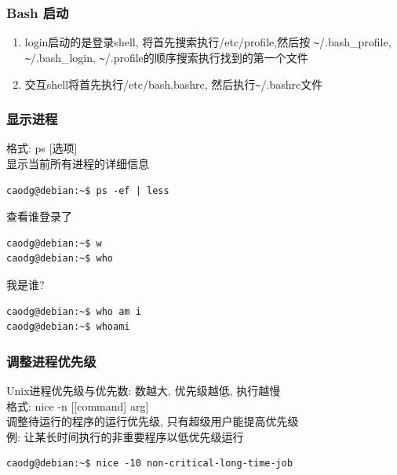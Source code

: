 \documentclass[compress]{beamer}
\begin{document}
\begin{frame}[containsverbatim]
\frametitle{Bash 启动}

\begin{enumerate}
\item login启动的是登录shell,
将首先搜索执行/etc/profile,然后按 \verb=~=/.bash\_profile,
\verb=~=/.bash\_login,
\verb=~=/.profile的顺序搜索执行找到的第一个文件

\item 交互shell将首先执行/etc/bash.bashrc, 然后执行\verb=~=/.bashrc文件
\end{enumerate}

\end{frame}

\begin{frame}[containsverbatim]
\frametitle{显示进程}

格式: \alert{ps} [选项] \\
显示当前所有进程的详细信息\\[1ex]
\begin{Verbatim}
caodg@debian:~$ ps -ef | less
\end{Verbatim}

查看谁登录了 \\
\begin{Verbatim}
caodg@debian:~$ w
caodg@debian:~$ who
\end{Verbatim}

我是谁?\\
\begin{Verbatim}
caodg@debian:~$ who am i
caodg@debian:~$ whoami
\end{Verbatim}


\end{frame}

\begin{frame}[containsverbatim]
\frametitle{调整进程优先级}

\alert{Unix进程优先级与优先数: 数越大, 优先级越低, 执行越慢}\\
格式: \alert{nice} -n [[command] arg]\\
调整待运行的程序的运行优先级, 只有超级用户能提高优先级\\[1ex]
例: 让某长时间执行的非重要程序以低优先级运行\\
\begin{Verbatim}
caodg@debian:~$ nice -10 non-critical-long-time-job
\end{Verbatim}


\end{frame}
\end{document}

